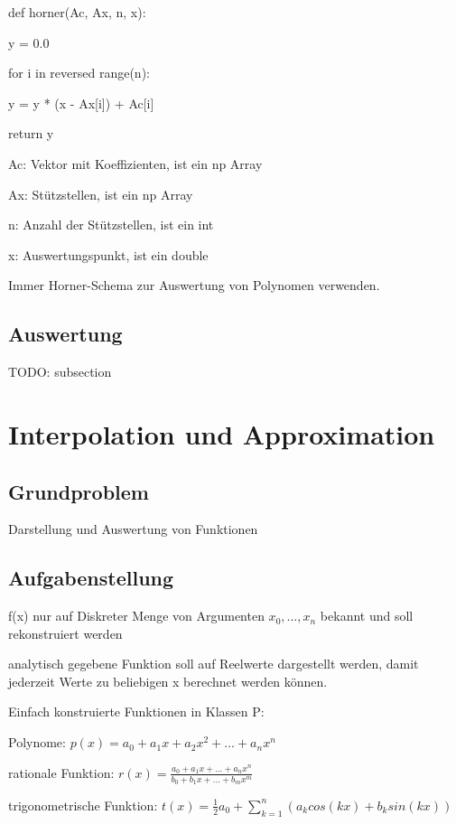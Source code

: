 \documentclass[12pt,a4paper]{article} %
\newcommand*\tab[1][1cm]{\hspace*{#1}}
\begin{document}
	def horner(Ac, Ax, n, x): 
	
	y = 0.0
	
	for i in reversed range(n):
	
	\tab y = y * (x - Ax[i]) + Ac[i]
 
	return y
	
	Ac: Vektor mit Koeffizienten, ist ein np Array
	
	Ax: Stützstellen, ist ein np Array
	
	n: Anzahl der Stützstellen, ist ein int
	
	x: Auswertungspunkt, ist ein double
	
	Immer Horner-Schema zur Auswertung von Polynomen verwenden.
	
	\subsection{Auswertung}
	TODO: subsection
	
	\newpage
	
	\section{Interpolation und Approximation}
	
	\subsection{Grundproblem}
	
	Darstellung und Auswertung von Funktionen
	
	\subsection{Aufgabenstellung}
	
	f(x) nur auf Diskreter Menge von Argumenten $x_0, ..., x_n$ bekannt und soll rekonstruiert werden
	
	analytisch gegebene Funktion soll auf Reelwerte dargestellt werden, damit jederzeit Werte zu beliebigen x berechnet werden können.
	
	Einfach konstruierte Funktionen in Klassen P:
	
	Polynome: $p(x) = a_0 + a_1x + a_2x^2 + ... + a_nx^n$
	
	rationale Funktion: $r(x) = \frac{a_0 + a_1x + ... + a_nx^n}{b_0 + b_1x + ... + b_mx^m}$
	
	trigonometrische Funktion: $t(x) = \frac{1}{2}a_0 + \sum_{k = 1}^{n}(a_kcos(kx) + b_ksin(kx))$
	
\end{document}
